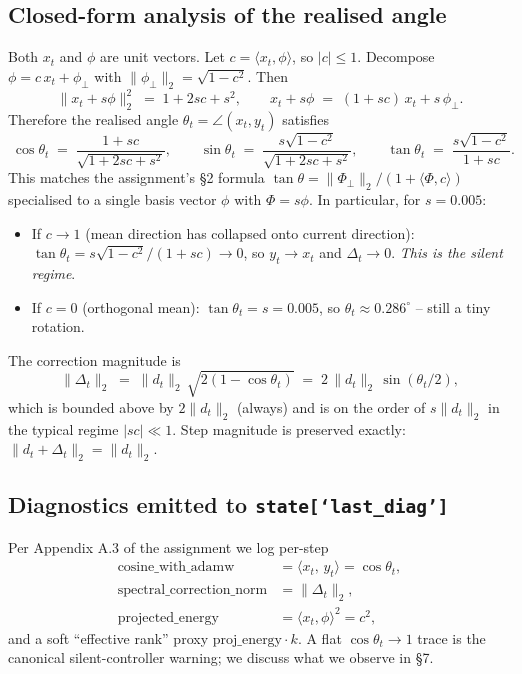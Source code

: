 \documentclass{article}
\begin{document}
\subsection{Closed-form analysis of the realised angle}
Both $x_t$ and $\phi$ are unit vectors.  Let $c = \langle x_t,\phi
\rangle$, so $|c|\le 1$.  Decompose $\phi = c\,x_t + \phi_{\!\perp}$
with $\|\phi_{\!\perp}\|_2 = \sqrt{1-c^2}$.  Then
\begin{equation}
\|x_t + s\phi\|_2^2 \;=\; 1 + 2sc + s^2,
\qquad
x_t + s\phi \;=\; (1+sc)\,x_t + s\,\phi_{\!\perp}.
\label{eq:norm-decomp}
\end{equation}
Therefore the realised angle $\theta_t = \angle(x_t, y_t)$ satisfies
\begin{equation}
\boxed{\;
\cos\theta_t \;=\; \frac{1+sc}{\sqrt{1+2sc+s^2}},
\qquad
\sin\theta_t \;=\; \frac{s\sqrt{1-c^2}}{\sqrt{1+2sc+s^2}},
\qquad
\tan\theta_t \;=\; \frac{s\sqrt{1-c^2}}{1+sc}.
\;}
\label{eq:angle}
\end{equation}
This matches the assignment's §2 formula
$\tan\theta = \|\Phi_{\!\perp}\|_2/(1+\langle\Phi,c\rangle)$
specialised to a single basis vector $\phi$ with $\Phi=s\phi$.  In
particular, for $s = 0.005$:
\begin{itemize}
  \item If $c\to 1$ (mean direction has collapsed onto current
        direction): $\tan\theta_t = s\sqrt{1-c^2}/(1+sc)\to 0$, so
        $y_t \to x_t$ and $\Delta_t \to 0$.  \emph{This is the silent
        regime}.
  \item If $c = 0$ (orthogonal mean): $\tan\theta_t = s = 0.005$, so
        $\theta_t \approx 0.286^{\circ}$ -- still a tiny rotation.
\end{itemize}
The correction magnitude is
\begin{equation}
\|\Delta_t\|_2 \;=\; \|d_t\|_2\,\sqrt{2(1-\cos\theta_t)}
                 \;=\; 2\,\|d_t\|_2\,\sin(\theta_t/2),
\label{eq:corr-norm}
\end{equation}
which is bounded above by $2\|d_t\|_2$ (always) and is on the order
of $s\|d_t\|_2$ in the typical regime $|sc|\ll 1$.  Step magnitude is
preserved exactly: $\|d_t + \Delta_t\|_2 = \|d_t\|_2$.

\subsection{Diagnostics emitted to \texttt{state[`last\_diag']}}
Per Appendix A.3 of the assignment we log per-step
\begin{align*}
\text{cosine\_with\_adamw} &= \langle x_t,\, y_t\rangle = \cos\theta_t,\\
\text{spectral\_correction\_norm} &= \|\Delta_t\|_2,\\
\text{projected\_energy} &= \langle x_t,\phi\rangle^2 = c^2,
\end{align*}
and a soft ``effective rank'' proxy $\text{proj\_energy}\cdot k$.  A
flat $\cos\theta_t \to 1$ trace is the canonical silent-controller
warning; we discuss what we observe in §7.
\end{document}
